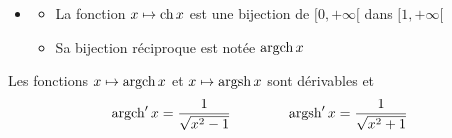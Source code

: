\begin{frame}
\vspace*{-1ex}
\begin{proposition}
\label{prop:chainette2}
\begin{itemize}
  \item 
  \begin{itemize}
    \item La fonction $x \mapsto \mathop{\text{ch}}\nolimits x$ est une bijection
de $[0,+\infty[$ dans $[1,+\infty[$
\pause    
    \item Sa bijection réciproque est notée $\mathop{\text{argch}}\nolimits x$
\uncover<4->{    
    \item $\ch\big(\Argch(x)\,\big) = x  \quad \forall x \in [1,+\infty[$
}
\uncover<5->{
    \item $\Argch\big(\ch(x)\,\big) = x \quad   \forall x \in [0,+\infty[$
}
  \end{itemize}
  
\end{itemize}
\end{proposition}

\pause
\vspace*{-2ex}
\shorthandoff{:}
\shorthandon{:}

\end{frame}


\begin{frame}

\begin{proposition}
\label{prop:chainette3}
Les fonctions $x \mapsto \mathop{\text{argch}}\nolimits x$ et $x \mapsto \mathop{\text{argsh}}\nolimits x$
sont dérivables et 
$$\mathop{\text{argch}}\nolimits' x = \frac{1}{\sqrt{x^2-1}} \qquad\qquad \mathop{\text{argsh}}\nolimits' x = \frac{1}{\sqrt{x^2+1}}$$
\end{proposition}

\end{frame}





